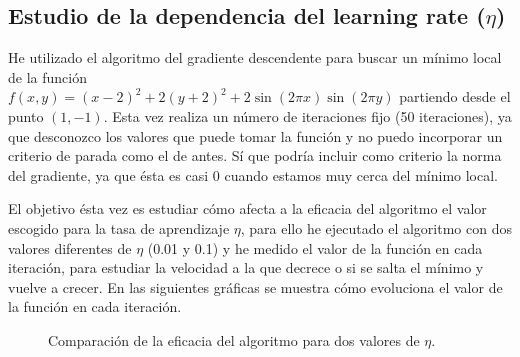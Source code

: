 \documentclass[a4]{article}
\begin{document}
\subsection{Estudio de la dependencia del \textbf{learning rate} ($\eta$)}

He utilizado el algoritmo del gradiente descendente para buscar un mínimo local de la función \\
$f(x,y)=(x-2)^2+2(y+2)^2+2\sin(2\pi x)\sin(2\pi y)$ partiendo desde el punto $(1,-1)$. Esta vez
realiza un número de iteraciones fijo (50 iteraciones), ya que desconozco los valores que puede
tomar la función y no puedo incorporar un criterio de parada como el de antes. Sí que podría incluir
como criterio la norma del gradiente, ya que ésta es casi 0 cuando estamos muy cerca del mínimo local.

El objetivo ésta vez es estudiar cómo afecta a la eficacia del algoritmo el valor escogido para la
tasa de aprendizaje $\eta$, para ello he ejecutado el algoritmo con dos valores diferentes de $\eta$
(0.01 y 0.1) y he medido el valor de la función en cada iteración, para estudiar la velocidad a la que
decrece o si se salta el mínimo y vuelve a crecer. En las siguientes gráficas se muestra cómo evoluciona
el valor de la función en cada iteración.

\begin{figure}[H]
    \centering    
    \caption{Comparación de la eficacia del algoritmo para dos valores de $\eta$.}
    \label{fig:comp-eta}
\end{figure}
\end{document}
